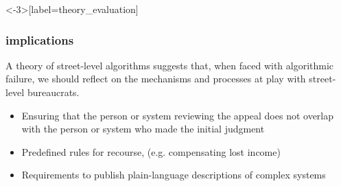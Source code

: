 \documentclass[presentation]{subfiles}
\begin{document}
\begin{frame}<-3>[label=theory_evaluation]




\end{frame}



\begin{frame}[t]\frametitle{implications}


  A theory of street-level algorithms suggests that, when faced with algorithmic failure, we should reflect on the mechanisms and processes at play with street-level bureaucrats.

\begin{itemize}
  \item Ensuring that the person or system reviewing the appeal does not overlap with the person or system who made the initial judgment
  \item Predefined rules for recourse, (e.g. compensating lost income)
  \item Requirements to publish plain-language descriptions of complex systems
\end{itemize}

\end{frame}
\end{document}
